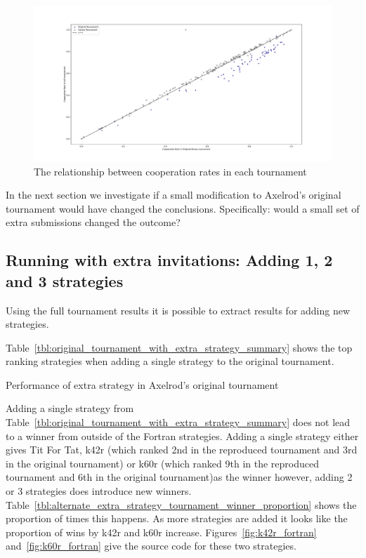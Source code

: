 \documentclass{article}
\begin{document}
\begin{figure}[!hbtp]
    \centering
    \includegraphics[width=.8\textwidth]{assets/relative_cooperation_rates}
    \caption{The relationship between cooperation rates in each tournament}
    \label{fig:relative_cooperation_rates}
\end{figure}

In the next section we investigate if a small modification to Axelrod's original
tournament would have changed the conclusions. Specifically: would a small
set of extra submissions changed the outcome?

\subsection{Running with extra invitations: Adding 1, 2 and 3 strategies}\label{sec:extra_strategy}

Using the full tournament results it is possible to extract results for adding
new strategies.

Table~\ref{tbl:original_tournament_with_extra_strategy_summary} shows the top
ranking strategies when adding a single strategy to the original tournament.

\begin{table}[!hbtp]
        \centering
        
        \caption{Performance of extra strategy in Axelrod's original tournament}
        \label{tbl:original_tournament_with_extra_strategy_summary}
\end{table}

Adding a single strategy from Table~\ref{tbl:original_tournament_with_extra_strategy_summary} 
does not lead to a winner from outside of the Fortran strategies.
Adding a
single strategy either gives Tit For Tat, k42r (which ranked 2nd in the
reproduced tournament and 3rd in the original tournament) or k60r (which ranked
9th in the
reproduced tournament and 6th in the original tournament)as the
winner however, adding 2 or 3 strategies does introduce new winners.
Table~\ref{tbl:alternate_extra_strategy_tournament_winner_proportion} 
shows the proportion of times this happens. As more strategies are added it
looks like the proportion of wins by k42r and k60r increase.
Figures~\ref{fig:k42r_fortran} and~\ref{fig:k60r_fortran} give the source code
for these two strategies.
\end{document}

